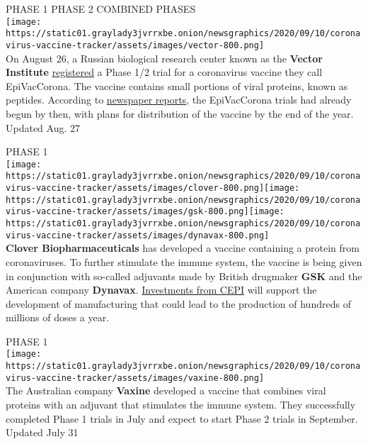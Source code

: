 PHASE 1 PHASE 2 COMBINED PHASES\\
\texttt{[image: https://static01.graylady3jvrrxbe.onion/newsgraphics/2020/09/10/coronavirus-vaccine-tracker/assets/images/vector-800.png]}\\
On August 26, a Russian biological research center known as the
\textbf{\textbf{Vector Institute}}
\href{https://clinicaltrials.gov/ct2/show/NCT04527575}{registered} a
Phase 1/2 trial for a coronavirus vaccine they call EpiVacCorona. The
vaccine contains small portions of viral proteins, known as peptides.
According to
\href{https://www.dailymail.co.uk/news/article-8656073/Second-Covid-vaccine-released-Russia-avoids-effects-one.html}{newspaper
reports}, the EpiVacCorona trials had already begun by then, with plans
for distribution of the vaccine by the end of the year.\\
Updated Aug. 27

PHASE 1\\
\texttt{[image: https://static01.graylady3jvrrxbe.onion/newsgraphics/2020/09/10/coronavirus-vaccine-tracker/assets/images/clover-800.png]}\texttt{[image: https://static01.graylady3jvrrxbe.onion/newsgraphics/2020/09/10/coronavirus-vaccine-tracker/assets/images/gsk-800.png]}\texttt{[image: https://static01.graylady3jvrrxbe.onion/newsgraphics/2020/09/10/coronavirus-vaccine-tracker/assets/images/dynavax-800.png]}\\
\textbf{\textbf{Clover Biopharmaceuticals}} has developed a vaccine
containing a protein from coronaviruses. To further stimulate the immune
system, the vaccine is being given in conjunction with so-called
adjuvants made by British drugmaker \textbf{\textbf{GSK}} and the
American company \textbf{\textbf{Dynavax}}.
\href{https://cepi.net/news_cepi/cepi-expands-partnership-with-clover-biopharmaceuticals-to-rapidly-advance-development-and-manufacture-of-covid-19-vaccine-candidate/}{Investments
from CEPI} will support the development of manufacturing that could lead
to the production of hundreds of millions of doses a year.

PHASE 1\\
\texttt{[image: https://static01.graylady3jvrrxbe.onion/newsgraphics/2020/09/10/coronavirus-vaccine-tracker/assets/images/vaxine-800.png]}\\
The Australian company \textbf{\textbf{Vaxine}} developed a vaccine that
combines viral proteins with an adjuvant that stimulates the immune
system. They successfully completed Phase 1 trials in July and expect to
start Phase 2 trials in September.\\
Updated July 31


